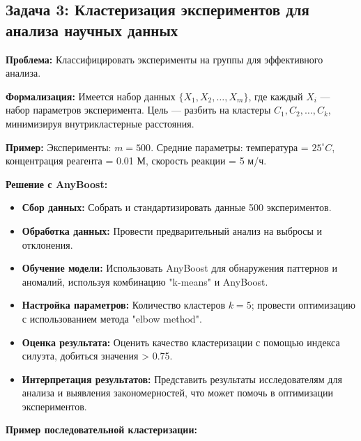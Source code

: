 \subsection*{Задача 3: Кластеризация экспериментов для анализа научных данных}

\textbf{Проблема:} Классифицировать эксперименты на группы для эффективного анализа.

\textbf{Формализация:} 
Имеется набор данных $\{X_1, X_2, \ldots, X_m\}$, где каждый $X_i$ — набор параметров эксперимента. Цель — разбить на кластеры $C_1, C_2, \ldots, C_k$, минимизируя внутрикластерные расстояния.

\textbf{Пример:} 
Эксперименты: $m = 500$. Средние параметры: температура = $25^\circ C$, концентрация реагента = 0.01 М, скорость реакции = 5 м/ч.

\textbf{Решение с AnyBoost:}
\begin{itemize}
    \item \textbf{Сбор данных:} Собрать и стандартизировать данные 500 экспериментов.
    \item \textbf{Обработка данных:} Провести предварительный анализ на выбросы и отклонения.
    \item \textbf{Обучение модели:} Использовать AnyBoost для обнаружения паттернов и аномалий, используя комбинацию "k-means" и AnyBoost.
    \item \textbf{Настройка параметров:} Количество кластеров $k = 5$; провести оптимизацию с использованием метода "elbow method".
    \item \textbf{Оценка результата:} Оценить качество кластеризации с помощью индекса силуэта, добиться значения > 0.75.
    \item \textbf{Интерпретация результатов:} Представить результаты исследователям для анализа и выявления закономерностей, что может помочь в оптимизации экспериментов.
\end{itemize}
\textbf{Пример последовательной кластеризации:}

